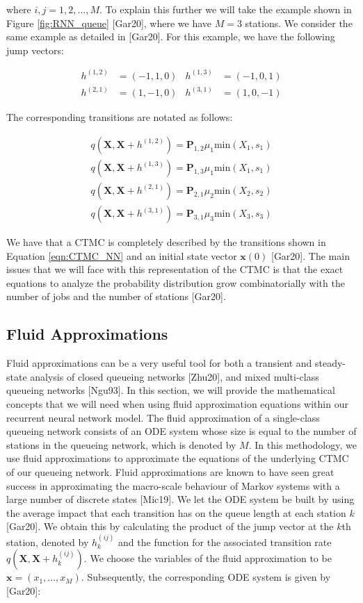 \documentclass[a4paper,11pt,titlepage]{article}
\begin{document}
where $i,j = 1,2,...,M$. To explain this further we will take the example shown in Figure \ref{fig:RNN_queue} [Gar20], where we have $M=3$ stations. We consider the same example as detailed in [Gar20]. For this example, we have the following jump vectors: 

\begin{align}
    h^{(1,2)} &= (-1,1,0)  & h^{(1,3)} &= (-1,0,1) \\
    h^{(2,1)} &= (1,-1,0)  & h^{(3,1)} &= (1,0,-1)
    \label{eqn:example_jump_equations}
\end{align}

The corresponding transitions are notated as follows: 

\begin{align}
    q(\mathbf{X},\mathbf{X}+h^{(1,2)}) = \mathbf{P}_{1,2} \mu_1 \text{min} (X_1,s_1) \\
    q(\mathbf{X},\mathbf{X}+h^{(1,3)}) = \mathbf{P}_{1,3} \mu_1 \text{min} (X_1,s_1) \\
    q(\mathbf{X},\mathbf{X}+h^{(2,1)}) = \mathbf{P}_{2,1} \mu_2 \text{min} (X_2,s_2) \\
    q(\mathbf{X},\mathbf{X}+h^{(3,1)}) = \mathbf{P}_{3,1} \mu_3 \text{min} (X_3,s_3) 
\end{align}

We have that a CTMC is completely described by the transitions shown in Equation \ref{eqn:CTMC_NN} and an initial state vector $\mathbf{x}(0)$ [Gar20]. The main issues that we will face with this representation of the CTMC is that the exact equations to analyze the probability distribution grow combinatorially with the number of jobs and the number of stations [Gar20]. 

\subsection{Fluid Approximations}

Fluid approximations can be a very useful tool for both a transient and steady-state analysis of closed queueing networks [Zhu20], and mixed multi-class queueing networks [Ngu93]. In this section, we will provide the mathematical concepts that we will need when using fluid approximation equations within our recurrent neural network model. The fluid approximation of a single-class queueing network consists of an ODE system whose size is equal to the number of stations in the queueing network, which is denoted by $M$. In this methodology, we use fluid approximations to approximate the equations of the underlying CTMC of our queueing network. Fluid approximations are known to have seen great success in approximating the macro-scale behaviour of Markov systems with a large number of discrete states [Mic19]. We let the ODE system be built by using the average impact that each transition has on the queue length at each station $k$ [Gar20]. We obtain this by calculating the product of the jump vector at the $k$th station, denoted by $h_k^{(ij)}$ and the function for the associated transition rate $q(\mathbf{X}, \mathbf{X}+h_k^{(ij)})$. We choose the variables of the fluid approximation to be $\mathbf{x} = (x_1,...,x_M)$. Subsequently, the corresponding ODE system is given by [Gar20]: 
\end{document}
